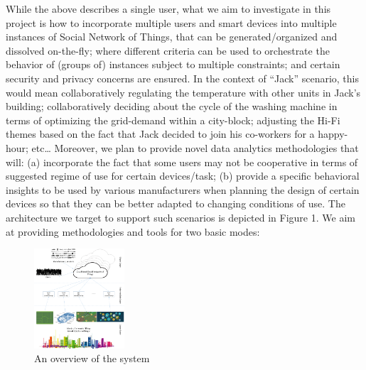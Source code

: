 While the above describes a single user, what we aim to investigate in this project is how to incorporate multiple users and smart devices into multiple instances of Social Network of Things, that can be generated/organized and dissolved on-the-fly; where different criteria can be used to orchestrate the behavior of (groups of) instances subject to multiple constraints; and certain security and privacy concerns are ensured. In the context of “Jack” scenario, this would mean collaboratively regulating the temperature with other units in Jack’s building; collaboratively deciding about the cycle of the washing machine in terms of optimizing the grid-demand within a city-block; adjusting the Hi-Fi themes based on the fact that Jack decided to join his co-workers for a happy-hour; etc… Moreover, we plan to provide novel data analytics methodologies that will: (a) incorporate the fact that some users may not be cooperative in terms of suggested regime of use for certain devices/task; (b) provide a specific behavioral insights to be used by various manufacturers when planning the design of certain devices so that they can be better adapted to changing conditions of use. 
The architecture we target to support such  scenarios is depicted in Figure 1. We aim at providing methodologies and tools for two basic modes: \\

\begin{figure} \vspace{-3mm}
	\centerline{\includegraphics[width=0.30\textwidth]{./fig1.png}}
	\vspace{-3mm} \caption{\small An overview of the system}
	\label{fig1}
	\vspace{-3mm}
\end{figure}

